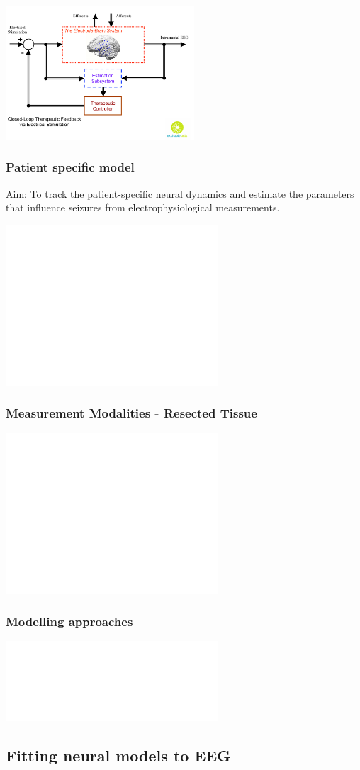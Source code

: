 \documentclass[compress]{beamer}
\begin{document}
\begin{frame}
	\begin{center}
		\includegraphics[height=5cm]{./Figures/StimulationSeizureControl.pdf}	
	\end{center}	
\end{frame}

\begin{frame}\frametitle{Patient specific model}
	Aim: To track the patient-specific neural dynamics and estimate the parameters that influence seizures from electrophysiological measurements. 
	\begin{center}
		\includegraphics<1>[height=6cm]{./Figures/BrainElectrode.pdf} 
	\end{center}
\end{frame}

\begin{frame}\frametitle{Measurement Modalities - Resected Tissue}
	\begin{center}
		\includegraphics<1>[height=6cm]{./Figures/spatiotemporalscales.pdf} 
	\end{center}
\end{frame}

\begin{frame}\frametitle{Modelling approaches} 
	\begin{center}
		\includegraphics<1>[height=3cm]{./Figures/ModellingApproaches.pdf} 
	\end{center}
\end{frame}
\subsection{Fitting neural models to EEG}

\end{document}
